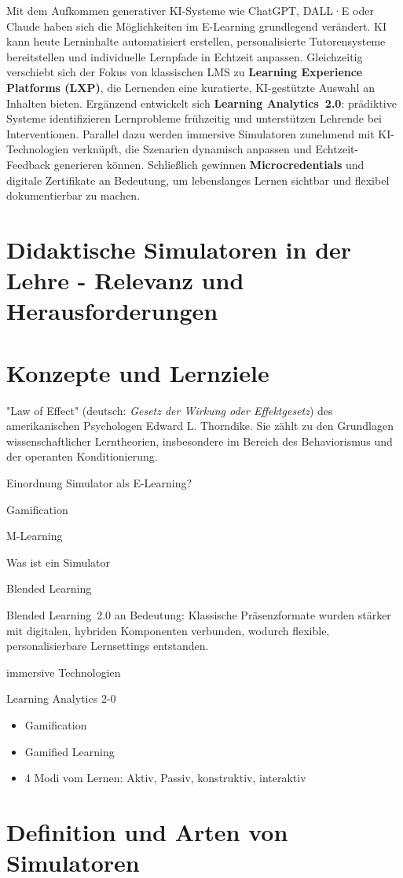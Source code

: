 Mit dem Aufkommen generativer KI-Systeme wie ChatGPT, DALL·E oder Claude haben sich die Möglichkeiten im E-Learning grundlegend verändert. KI kann heute Lerninhalte automatisiert erstellen, personalisierte Tutorensysteme bereitstellen und individuelle Lernpfade in Echtzeit anpassen.\parencite[S.~43]{zhai_chatgpt_2023} Gleichzeitig verschiebt sich der Fokus von klassischen LMS zu \textbf{Learning Experience Platforms (LXP)}, die Lernenden eine kuratierte, KI-gestützte Auswahl an Inhalten bieten.\parencite[S.~1]{cockrill_learning_2021} Ergänzend entwickelt sich \textbf{Learning Analytics~2.0}: prädiktive Systeme identifizieren Lernprobleme frühzeitig und unterstützen Lehrende bei Interventionen.\parencite[S.~1979f]{ifenthaler_utilising_2020} Parallel dazu werden immersive Simulatoren zunehmend mit KI-Technologien verknüpft, die Szenarien dynamisch anpassen und Echtzeit-Feedback generieren können. Schließlich gewinnen \textbf{Microcredentials} und digitale Zertifikate an Bedeutung, um lebenslanges Lernen sichtbar und flexibel dokumentierbar zu machen.\parencite[S.~1]{gish-lieberman_micro-credentials_2021}

\section{Didaktische Simulatoren in der Lehre - Relevanz und Herausforderungen}

\section{Konzepte und Lernziele}


"Law of Effect" (deutsch: \textit{Gesetz der Wirkung oder Effektgesetz}) des amerikanischen Psychologen Edward L. Thorndike. Sie zählt zu den Grundlagen wissenschaftlicher Lerntheorien, insbesondere im Bereich des Behaviorismus und der operanten Konditionierung.

Einordnung Simulator als E-Learning?

Gamification

M-Learning

Was ist ein Simulator

Blended Learning

Blended Learning~2.0 an Bedeutung: Klassische Präsenzformate wurden stärker mit digitalen, hybriden Komponenten verbunden, wodurch flexible, personalisierbare Lernsettings entstanden.\parencite{bonk2020}

immersive Technologien

Learning Analytics 2-0

\begin{itemize}
    \item Gamification
    \item Gamified Learning
    \item 4 Modi vom Lernen: Aktiv, Passiv, konstruktiv, interaktiv
\end{itemize}

\section{Definition und Arten von Simulatoren}
